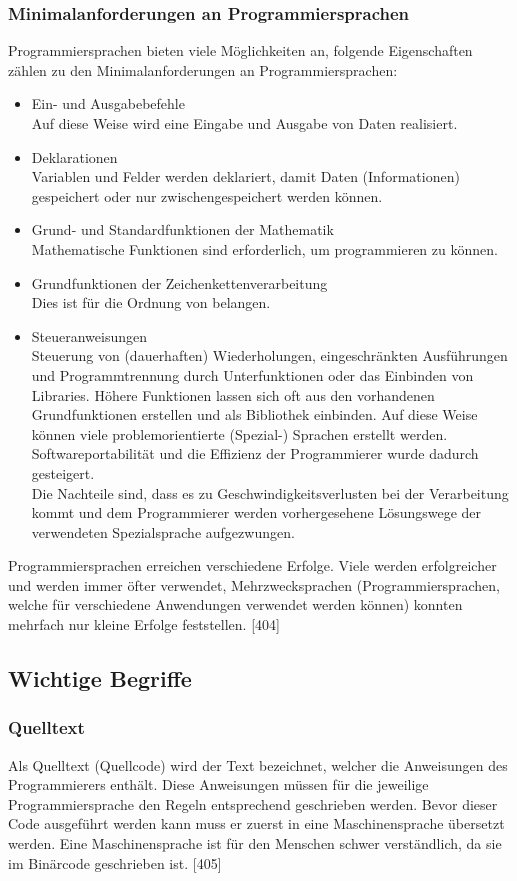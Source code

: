 \documentclass[12pt,a4paper]{report}
\begin{document}
\begin{onehalfspace}
\subsubsection{Minimalanforderungen an Programmiersprachen}
Programmiersprachen bieten viele Möglichkeiten an, folgende Eigenschaften zählen zu den Minimalanforderungen an Programmiersprachen:
\begin{itemize}
\item Ein- und Ausgabebefehle\\
Auf diese Weise wird eine Eingabe und Ausgabe von Daten realisiert.
\item Deklarationen\\
Variablen und Felder werden deklariert, damit Daten (Informationen) gespeichert oder nur zwischengespeichert werden können.
\item Grund- und Standardfunktionen der Mathematik\\
Mathematische Funktionen sind erforderlich, um programmieren zu können.
\item Grundfunktionen der Zeichenkettenverarbeitung\\
Dies ist für die Ordnung von belangen.
\item Steueranweisungen\\
Steuerung von (dauerhaften) Wiederholungen, eingeschränkten Ausführungen und Programmtrennung durch Unterfunktionen oder das Einbinden von Libraries. Höhere Funktionen lassen sich oft aus den vorhandenen Grundfunktionen erstellen und als Bibliothek einbinden. Auf diese Weise können viele problemorientierte (Spezial-) Sprachen erstellt werden. Softwareportabilität und die Effizienz der Programmierer wurde dadurch gesteigert.\\
Die Nachteile sind, dass es zu Geschwindigkeitsverlusten bei der Verarbeitung kommt und dem Programmierer werden vorhergesehene Lösungswege der verwendeten Spezialsprache aufgezwungen.
\end{itemize}
Programmiersprachen erreichen verschiedene Erfolge. Viele werden erfolgreicher und werden immer öfter verwendet,  Mehrzwecksprachen (Programmiersprachen, welche für verschiedene Anwendungen verwendet werden können) konnten mehrfach nur kleine Erfolge feststellen. [404]

\subsection{Wichtige Begriffe}
\subsubsection{Quelltext}
Als Quelltext (Quellcode) wird der Text bezeichnet, welcher die Anweisungen des Programmierers enthält. Diese Anweisungen müssen für die jeweilige Programmiersprache den Regeln entsprechend geschrieben werden. Bevor dieser Code ausgeführt werden kann muss er zuerst in eine Maschinensprache übersetzt werden. Eine Maschinensprache ist für den Menschen schwer verständlich, da sie im Binärcode geschrieben ist. [405]


\end{onehalfspace}
\end{document}

